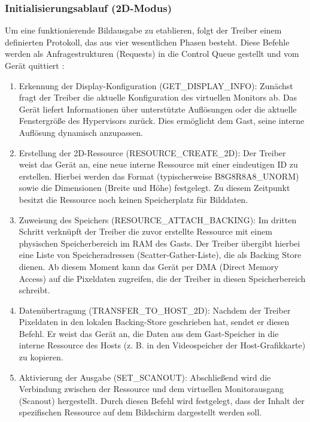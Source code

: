 \subsubsection{Initialisierungsablauf (2D-Modus)}

Um eine funktionierende Bildausgabe zu etablieren, folgt der Treiber einem definierten Protokoll, das aus vier wesentlichen Phasen besteht. Diese Befehle werden als Anfragestrukturen (Requests) in die Control Queue gestellt und vom Gerät quittiert \cite[Abschnitt~5.7]{OASISVirtio12}:

\begin{enumerate}
 \item Erkennung der Display-Konfiguration (GET\_DISPLAY\_INFO): Zunächst fragt der Treiber die aktuelle Konfiguration des virtuellen Monitors ab. Das Gerät liefert Informationen über unterstützte Auflösungen oder die aktuelle Fenstergröße des Hypervisors zurück. Dies ermöglicht dem Gast, seine interne Auflösung dynamisch anzupassen.
 \item Erstellung der 2D-Ressource (RESOURCE\_CREATE\_2D): Der Treiber weist das Gerät an, eine neue interne Ressource mit einer eindeutigen ID zu erstellen. Hierbei werden das Format (typischerweise B8G8R8A8\_UNORM) sowie die Dimensionen (Breite und Höhe) festgelegt. Zu diesem Zeitpunkt besitzt die Ressource noch keinen Speicherplatz für Bilddaten.
 \item Zuweisung des Speichers (RESOURCE\_ATTACH\_BACKING): Im dritten Schritt verknüpft der Treiber die zuvor erstellte Ressource mit einem physischen Speicherbereich im RAM des Gasts. Der Treiber übergibt hierbei eine Liste von Speicheradressen (Scatter-Gather-Liste), die als Backing Store dienen. Ab diesem Moment kann das Gerät per DMA (Direct Memory Access) auf die Pixeldaten zugreifen, die der Treiber in diesen Speicherbereich schreibt.
 \item Datenübertragung (TRANSFER\_TO\_HOST\_2D): Nachdem der Treiber Pixeldaten in den lokalen Backing-Store geschrieben hat, sendet er diesen Befehl. Er weist das Gerät an, die Daten aus dem Gast-Speicher in die interne Ressource des Hosts (z. B. in den Videospeicher der Host-Grafikkarte) zu kopieren.
 \item Aktivierung der Ausgabe (SET\_SCANOUT): Abschließend wird die Verbindung zwischen der Ressource und dem virtuellen Monitorausgang (Scanout) hergestellt. Durch diesen Befehl wird festgelegt, dass der Inhalt der spezifischen Ressource auf dem Bildschirm dargestellt werden soll.
\end{enumerate}

